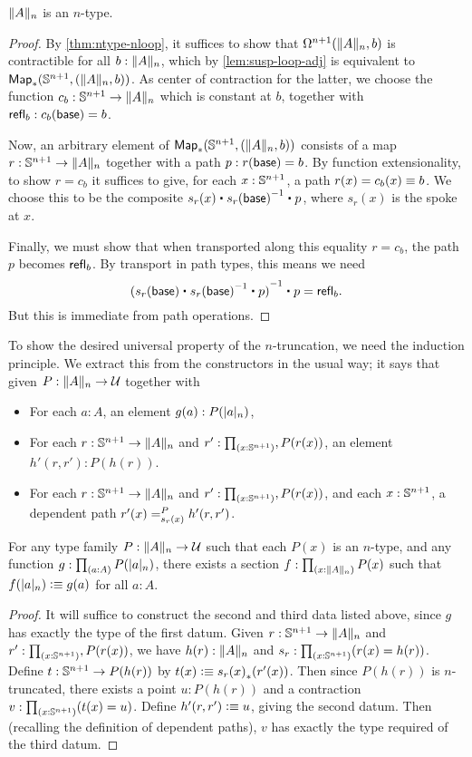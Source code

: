 \begin{lem}
  $\trunc n A$ is an $n$-type.
\end{lem}
\begin{proof}
  By \autoref{thm:ntype-nloop}, it suffices to show that $\Omega ^{n+1}(\trunc nA,b)$ is contractible for all $b:\trunc nA$, which by
\autoref{lem:susp-loop-adj} is equivalent to $\Map_*(\Sn^{n+1},(\trunc nA,b))$.
  As center of contraction for the latter, we choose the function $c_b:\Sn^{n+1} \to \trunc nA$ which is constant at $b$, together with
$\refl b : c_b(\base) = b$.

  Now, an arbitrary element of $\Map_*(\Sn^{n+1},(\trunc nA,b))$ consists of a map $r:\Sn^{n+1} \to \trunc n A$ together with a path
$p:r(\base)=b$.
  By function extensionality, to show $r = c_b$ it suffices to give, for each $x:\Sn^{n+1}$, a path $r(x)=c_b(x) \jdeq b$.
  We choose this to be the composite $s_r(x) \ct \opp{s_r(\base)} \ct p$, where $s_r(x)$ is the spoke at $x$.


  Finally, we must show that when transported along this equality $r=c_b$, the path $p$ becomes $\refl b$.
  By transport in path types, this means we need
  \[\opp{(s_r(\base) \ct \opp{s_r(\base)} \ct p)} \ct p = \refl b.\]
  But this is immediate from path operations.
\end{proof}

To show the desired universal property of the $n$-truncation, we need the induction principle.
We extract this from the constructors in the usual way; it says that given $P:\trunc nA\to\type$ together with
\begin{itemize}
\item For each $a:A$, an element $g(a) : P(\tproj na)$,
\item For each $r:\Sn^{n+1} \to \trunc n A$ and $r':\prd{x:\Sn^{n+1}}, P(r(x))$, an element $h'(r,r'):P(h(r))$.
\item For each $r:\Sn^{n+1} \to \trunc n A$ and $r':\prd{x:\Sn^{n+1}}, P(r(x))$, and each $x:\Sn^{n+1}$, a dependent path
$\dpath{P}{s_r(x)}{r'(x)}{h'(r,r')}$.
\end{itemize}

\begin{thm}\label{thm:truncn-ind}
  For any type family $P:\trunc n A \to \type$ such that each $P(x)$ is an $n$-type, and any function $g : \prd{a:A} P(\tproj n a)$, there
exists a section $f:\prd{x:\trunc n A} P(x)$ such that $f(\tproj n a)\defeq g(a)$ for all $a:A$.
\end{thm}
\begin{proof}
  It will suffice to construct the second and third data listed above, since $g$ has exactly the type of the first datum.
  Given $r:\Sn^{n+1} \to \trunc n A$ and $r':\prd{x:\Sn^{n+1}}, P(r(x))$, we have $h(r):\trunc n A$ and $s_r :\prd{x:\Sn^{n+1}} (r(x) =
h(r))$.
  Define $t:\Sn^{n+1} \to P(h(r))$ by $t(x) \defeq \trans{s_r(x)}{r'(x)}$.
  Then since $P(h(r))$ is $n$-truncated, there exists a point $u:P(h(r))$ and a contraction $v:\prd{x:\Sn^{n+1}} (t(x) = u)$.
  Define $h'(r,r') \defeq u$, giving the second datum.
  Then (recalling the definition of dependent paths), $v$ has exactly the type required of the third datum.
\end{proof}

